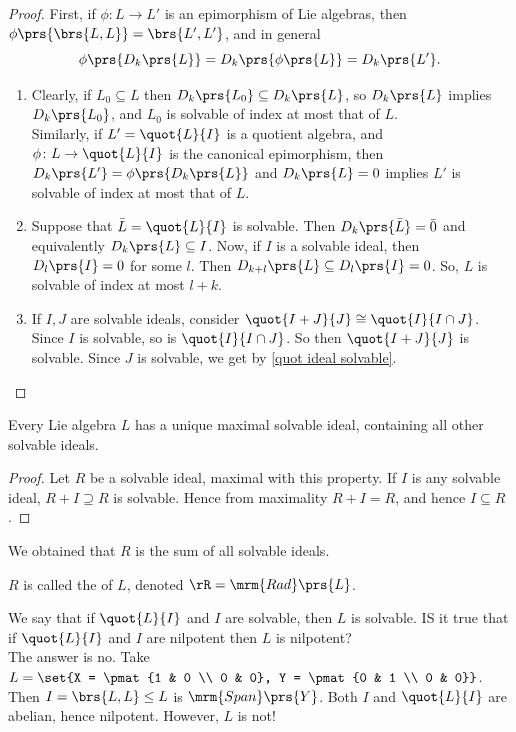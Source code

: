 \documentclass[10pt,a4paper,twoside,openany,hidelinks]{book}
\begin{document}
\begin{proof}
First, if $\phi \colon L \to L'$ is an epimorphism of Lie algebras, then $\phi\prs{\brs{L,L}} = \brs{L',L'}$, and in general \[\phi\prs{D_k\prs{L}} = D_k\prs{\phi\prs{L}} = D_k\prs{L'}\text{.}\]
\begin{enumerate}
\item Clearly, if $L_0 \subseteq L$ then $D_k\prs{L_0} \subseteq D_k\prs{L}$, so $D_k\prs{L}$ implies $D_k\prs{L_0}$, and $L_0$ is solvable of index at most that of $L$.\\
Similarly, if $L' = \quot{L}{I}$ is a quotient algebra, and $\phi \colon L \to \quot{L}{I}$ is the canonical epimorphism, then $D_k\prs{L'} = \phi\prs{D_k\prs{L}}$ and $D_k\prs{L} = 0$ implies $L'$ is solvable of index at most that of $L$.
\item Suppose that $\bar{L} = \quot{L}{I}$ is solvable. Then $D_k\prs{\bar{L}} = \bar{0}$ and equivalently $D_k\prs{L} \subseteq I$. Now, if $I$ is a solvable ideal, then $D_l\prs{I} = 0$ for some $l$. Then $D_{k+l}\prs{L} \subseteq D_l\prs{I} = 0$. So, $L$ is solvable of index at most $l+k$.
\item If $I,J$ are solvable ideals, consider $\quot{I+J}{J} \cong \quot{I}{I \cap J}$. Since $I$ is solvable, so is $\quot{I}{I \cap J}$. So then $\quot{I + J}{J}$ is solvable. Since $J$ is solvable, we get by \eqref{quot ideal solvable}.
\end{enumerate}
\end{proof}
\begin{proposition}
Every Lie algebra $L$ has a unique maximal solvable ideal, containing all other solvable ideals.
\end{proposition}
\begin{proof}
Let $R$ be a solvable ideal, maximal with this property. If $I$ is any solvable ideal, $R+I \supseteq R$ is solvable. Hence from maximality $R+I = R$, and hence $I \subseteq R$.
\end{proof}
\begin{remark}
We obtained that $R$ is the sum of all solvable ideals.
\end{remark}
\begin{definition}
$R$ is called the  of $L$, denoted $\rR = \mrm{Rad}\prs{L}$.
\end{definition}
\begin{question}
We say that if $\quot{L}{I}$ and $I$ are solvable, then $L$ is solvable. IS it true that if $\quot{L}{I}$ and $I$ are nilpotent then $L$ is nilpotent?\\
The answer is no. Take $L = \set{X = \pmat{1 & 0 \\ 0 & 0}, Y = \pmat{0 & 1 \\ 0 & 0}}$. Then $I = \brs{L,L} \leq L$ is $\mrm{Span}\prs{Y}$. Both $I$ and $\quot{L}{I}$ are abelian, hence nilpotent. However, $L$ is not!
\end{question}
\end{document}
